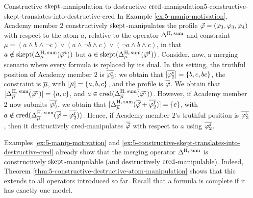 \begin{xmpl}{Constructive $\skept$-manipulation to destructive $\cred$-manipulation}{5-constructive-skept-translates-into-destructive-cred}
	In Example \ref{ex:5-manip-motivation}, Academy member $2$
	constructively $\skept$-manipulates the profile $\P=(\phi_1,\phi_3,\phi_4)$
	with respect to the atom $a$, 
	relative to the operator $\me^{\hamming,\:\ssum}$ and constraint 
	$\mu=(a\land b\land \lnot c)\lor (a\land\lnot b\land c)\lor(\lnot a\land b\land c)$, 
	in that $a\notin\skept(\me^{\hamming,\:\ssum}_{\mu}(\truth{\P}))$ 
	but $a\in\skept(\me^{\hamming,\:\ssum}_{\mu}(\manip{\P}))$.
	Consider, now, a merging scenario where every formula is replaced by its dual.
	In this setting, the truthful position of Academy member $2$ 
	is $\dual{\truth{\phi}_2}$:
	we obtain that $[\dual{\truth{\phi}_2}]=\{b,c,bc\}$,
	the constraint is $\dual{\mu}$,
	with $[\dual{\mu}]=\{a,b,c\}$, 
	and the profile is $\dual{\P}$.
	We obtain that $[\me^{\hamming,\:\ssum}_{\dual{\mu}}{\dual(\truth{\P})}]=\{a,c\}$,
	and $a\in\cred(\me^{\hamming,\:\ssum}_{\dual{\mu}}{\dual(\truth{\P})})$.
	However, if Academy member $2$ now submits $\dual{\manip{\phi}_2}$, we obtain that 
	$[\me^{\hamming,\:\ssum}_{\dual{\mu}}(\dual{\P}+\dual{\manip{\phi}_2})]=\{c\}$, 
	with $a\notin\cred(\me^{\hamming,\:\ssum}_{\dual{\mu}}(\dual{\P}+\dual{\manip{\phi}_2}))$.
	Hence, if Academy member $2$'s truthful position is $\dual{\truth{\phi}_2}$,
	then it destructively $\cred$-manipulates $\dual{\P}$ with respect to $a$ using $\dual{\manip{\phi}_2}$.	
\end{xmpl}

Examples \ref{ex:5-manip-motivation} and
\ref{ex:5-constructive-skept-translates-into-destructive-cred} 
already show that the merging operator 
$\me^{\hamming,\:\ssum}$ is constructively $\skept$-manipulable 
(and destructively $\cred$-manipulable).
Indeed, Theorem \ref{thm:5-constructive-destructive-atom-manipulation}
shows that this extends to all operators introduced so far.
Recall that a formula is complete if it has exactly one model.

